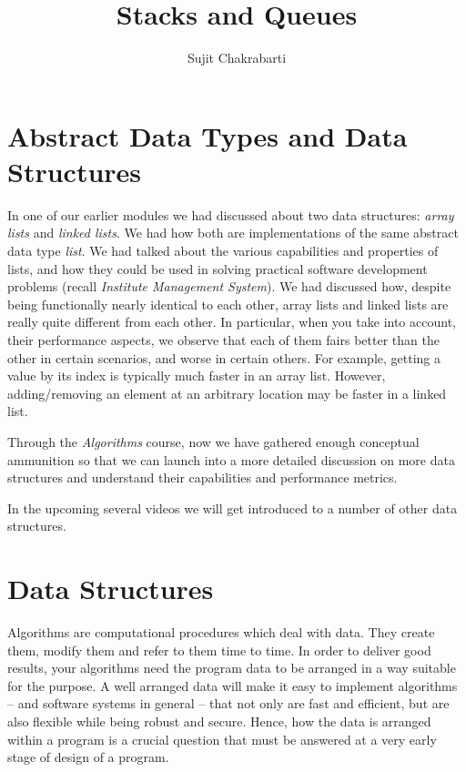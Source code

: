 \documentclass[12pt,a4paper]{article}
\author{Sujit Chakrabarti}
\title{Stacks and Queues}
\date{}
\begin{document}

\newcommand{\highlight}[1]{{\color{Red}(#1)}}
\newcommand{\comment}[1]{{\color{Blue}#1}}


\maketitle

\section{Abstract Data Types and Data Structures}
In one of our earlier modules we had discussed about two data structures: \emph{array lists} and \emph{linked lists}. We had how both are implementations of the same abstract data type \emph{list}. We had talked about the various capabilities and properties of lists, and how they could be used in solving practical software development problems (recall \emph{Institute Management System}). We had discussed how, despite being functionally nearly identical to each other, array lists and linked lists are really quite different from each other. In particular, when you take into account, their performance aspects, we observe that each of them fairs better than the other in certain scenarios, and worse in certain others. For example, getting a value by its index is typically much faster in an array list. However, adding/removing an element at an arbitrary location may be faster in a linked list.

Through the \emph{Algorithms} course, now we have gathered enough conceptual ammunition so that we can launch into a more detailed discussion on more data structures and understand their capabilities and performance metrics.

In the upcoming several videos we will get introduced to a number of other data structures.

\section{Data Structures}
Algorithms are computational procedures which deal with data. They create them, modify them and refer to them time to time. In order to deliver good results, your algorithms need the program data to be arranged in a way suitable for the purpose. A well arranged data will make it easy to implement algorithms -- and software systems in general -- that not only are fast and efficient, but are also flexible while being robust and secure. Hence, how the data is arranged within a program is a crucial question that must be answered at a very early stage of design of a program.
\end{document}
